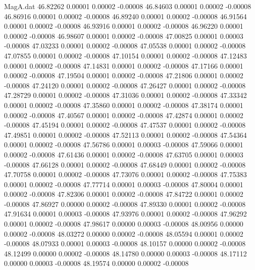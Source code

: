 \begin{filecontents}{MagA.dat}
  46.82262    0.00001    0.00002   -0.00008
  46.84603    0.00001    0.00002   -0.00008
  46.86916    0.00001    0.00002   -0.00008
  46.89240    0.00001    0.00002   -0.00008
  46.91564    0.00001    0.00002   -0.00008
  46.93916    0.00001    0.00002   -0.00008
  46.96220    0.00001    0.00002   -0.00008
  46.98607    0.00001    0.00002   -0.00008
  47.00825    0.00001    0.00003   -0.00008
  47.03233    0.00001    0.00002   -0.00008
  47.05538    0.00001    0.00002   -0.00008
  47.07855    0.00001    0.00002   -0.00008
  47.10154    0.00001    0.00002   -0.00008
  47.12483    0.00001    0.00002   -0.00008
  47.14831    0.00001    0.00002   -0.00008
  47.17166    0.00001    0.00002   -0.00008
  47.19504    0.00001    0.00002   -0.00008
  47.21806    0.00001    0.00002   -0.00008
  47.24120    0.00001    0.00002   -0.00008
  47.26427    0.00001    0.00002   -0.00008
  47.28729    0.00001    0.00002   -0.00008
  47.31036    0.00001    0.00002   -0.00008
  47.33342    0.00001    0.00002   -0.00008
  47.35860    0.00001    0.00002   -0.00008
  47.38174    0.00001    0.00002   -0.00008
  47.40567    0.00001    0.00002   -0.00008
  47.42874    0.00001    0.00002   -0.00008
  47.45194    0.00001    0.00002   -0.00008
  47.47537    0.00001    0.00002   -0.00008
  47.49851    0.00001    0.00002   -0.00008
  47.52113    0.00001    0.00002   -0.00008
  47.54364    0.00001    0.00002   -0.00008
  47.56786    0.00001    0.00003   -0.00008
  47.59066    0.00001    0.00002   -0.00008
  47.61436    0.00001    0.00002   -0.00008
  47.63705    0.00001    0.00003   -0.00008
  47.66128    0.00001    0.00002   -0.00008
  47.68449    0.00001    0.00002   -0.00008
  47.70758    0.00001    0.00002   -0.00008
  47.73076    0.00001    0.00002   -0.00008
  47.75383    0.00001    0.00002   -0.00008
  47.77714    0.00001    0.00003   -0.00008
  47.80004    0.00001    0.00002   -0.00008
  47.82306    0.00001    0.00002   -0.00008
  47.84722    0.00001    0.00002   -0.00008
  47.86927    0.00000    0.00002   -0.00008
  47.89330    0.00001    0.00002   -0.00008
  47.91634    0.00001    0.00003   -0.00008
  47.93976    0.00001    0.00002   -0.00008
  47.96292    0.00001    0.00002   -0.00008
  47.98617    0.00000    0.00003   -0.00008
  48.00956    0.00000    0.00002   -0.00008
  48.03272    0.00000    0.00002   -0.00008
  48.05594    0.00001    0.00002   -0.00008
  48.07933    0.00001    0.00003   -0.00008
  48.10157    0.00000    0.00002   -0.00008
  48.12499    0.00000    0.00002   -0.00008
  48.14780    0.00000    0.00003   -0.00008
  48.17112    0.00000    0.00003   -0.00008
  48.19574    0.00000    0.00002   -0.00008

\end{filecontents}
